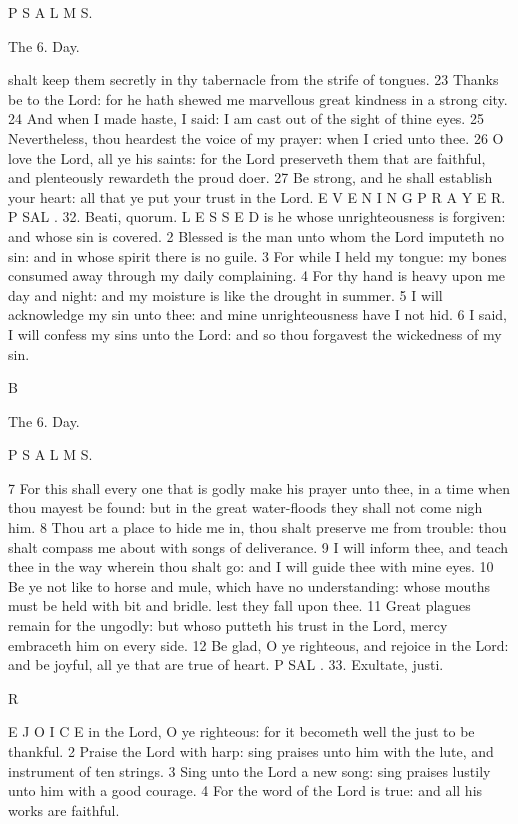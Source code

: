 P S A L M S.

The 6. Day.

shalt keep them secretly in thy tabernacle from the strife of tongues. 23 Thanks be to the Lord: for he hath shewed me marvellous great kindness in a strong city. 24 And when I made haste, I said: I am cast out of the sight of thine eyes. 25 Nevertheless, thou heardest the voice of my prayer: when I cried unto thee. 26 O love the Lord, all ye his saints: for the Lord preserveth them that are faithful, and plenteously rewardeth the proud doer. 27 Be strong, and he shall establish your heart: all that ye put your trust in the Lord. E V E N I N G P R A Y E R. P SAL . 32. Beati, quorum. L E S S E D is he whose unrighteousness is forgiven: and whose sin is covered. 2 Blessed is the man unto whom the Lord imputeth no sin: and in whose spirit there is no guile. 3 For while I held my tongue: my bones consumed away through my daily complaining. 4 For thy hand is heavy upon me day and night: and my moisture is like the drought in summer. 5 I will acknowledge my sin unto thee: and mine unrighteousness have I not hid. 6 I said, I will confess my sins unto the Lord: and so thou forgavest the wickedness of my sin.

B

The 6. Day.

P S A L M S.

7 For this shall every one that is godly make his prayer unto thee, in a time when thou mayest be found: but in the great water-floods they shall not come nigh him. 8 Thou art a place to hide me in, thou shalt preserve me from trouble: thou shalt compass me about with songs of deliverance. 9 I will inform thee, and teach thee in the way wherein thou shalt go: and I will guide thee with mine eyes. 10 Be ye not like to horse and mule, which have no understanding: whose mouths must be held with bit and bridle. lest they fall upon thee. 11 Great plagues remain for the ungodly: but whoso putteth his trust in the Lord, mercy embraceth him on every side. 12 Be glad, O ye righteous, and rejoice in the Lord: and be joyful, all ye that are true of heart. P SAL . 33. Exultate, justi.

R

E J O I C E in the Lord, O ye righteous: for it becometh well the just to be thankful. 2 Praise the Lord with harp: sing praises unto him with the lute, and instrument of ten strings. 3 Sing unto the Lord a new song: sing praises lustily unto him with a good courage. 4 For the word of the Lord is true: and all his works are faithful.

